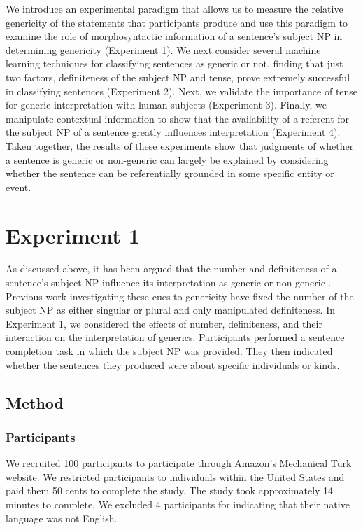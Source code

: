 \documentclass[10pt,letterpaper]{article}
\begin{document}
We introduce an experimental paradigm that allows us to measure the relative genericity of the statements that participants produce and use this paradigm to examine the role of morphosyntactic information of a sentence's subject NP in determining genericity (Experiment 1). We next consider several machine learning techniques for classifying sentences as generic or not, finding that just two factors, definiteness of the subject NP and tense, prove extremely successful in classifying sentences (Experiment 2). Next, we validate the importance of tense for generic interpretation with human subjects (Experiment 3). Finally, we manipulate contextual information to show that the availability of a referent for the subject NP of a sentence greatly influences interpretation (Experiment 4). Taken together, the results of these experiments show that judgments of whether a sentence is generic or non-generic can largely be explained by considering whether the sentence can be referentially grounded in some specific entity or event.

\section{Experiment 1}

As discussed above, it has been argued that the number and definiteness of a sentence's subject NP influence its interpretation as generic or non-generic \cite{Carlson:1977,Krifka:1995,Lyons:1977}. Previous work investigating these cues to genericity have fixed the number of the subject NP as either singular \cite{Cimpian:2011} or plural \cite{Gelman:2003} and only manipulated definiteness. In Experiment 1, we considered the effects of number, definiteness, and their interaction on the interpretation of generics. Participants performed a sentence completion task in which the subject NP was provided. They then indicated whether the sentences they produced were about specific individuals or kinds.

\subsection{Method}

\subsubsection{Participants} 

We recruited 100 participants to participate through Amazon's Mechanical Turk website. We restricted participants to individuals within the United States and paid them 50 cents to complete the study. The study took approximately 14 minutes to complete. We excluded 4 participants for indicating that their native language was not English.
\end{document}
